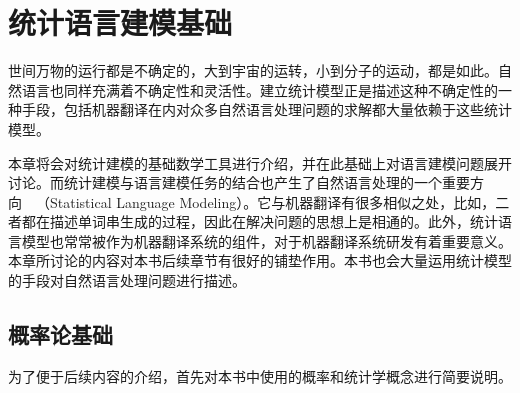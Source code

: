 
%


\renewcommand\figurename{图}%
\renewcommand\tablename{表}%


\chapter{统计语言建模基础}

\parinterval 世间万物的运行都是不确定的，大到宇宙的运转，小到分子的运动，都是如此。自然语言也同样充满着不确定性和灵活性。建立统计模型正是描述这种不确定性的一种手段，包括机器翻译在内对众多自然语言处理问题的求解都大量依赖于这些统计模型。

\parinterval 本章将会对统计建模的基础数学工具进行介绍，并在此基础上对语言建模问题展开讨论。而统计建模与语言建模任务的结合也产生了自然语言处理的一个重要方向\ \dash\ {\small{}}（Statistical Language Modeling）。它与机器翻译有很多相似之处，比如，二者都在描述单词串生成的过程，因此在解决问题的思想上是相通的。此外，统计语言模型也常常被作为机器翻译系统的组件，对于机器翻译系统研发有着重要意义。本章所讨论的内容对本书后续章节有很好的铺垫作用。本书也会大量运用统计模型的手段对自然语言处理问题进行描述。


\sectionnewpage
\section{概率论基础}
\parinterval 为了便于后续内容的介绍，首先对本书中使用的概率和统计学概念进行简要说明。


